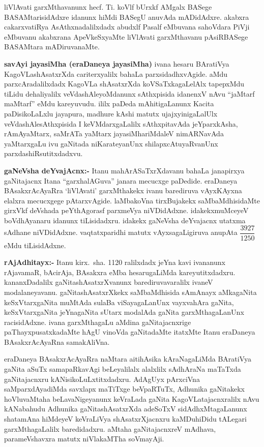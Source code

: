 liVlAvati garxMthavanunx hecf. Ti. koVlf bUrxkf AMgalx BASege BASAMtarisidAdxre idanunx hiMdi BASegU anuvAda mADidAdxre. akabxra cakarxvatiRya AsAthxna\-dalilxdadx abudxlf Pasalf eMbuvana sahoVdara PiVji eMbuvanu akabxrana ApeVkeSxyaMte liVlAvati garxMthavanu pAsiRBASege BASAMtara mADiruvanaMte.

\textbf{savAyi jayasiMha (eraDaneya jayasiMha)}
ivana hesaru BAratiVya KagoVLashAsatxrXda cariterxyalilx bahaLa parxsidadhxvAgide. aMdu parxcAradalilxdadx KagoVLa shAsatxrXda koVSaTxkagaLelAlx tapepxMdu tiLidu dehaliyalilx veVdashAleyoMdanunx sAthxpisida idanenxV nAvu ``jaMtarf maMtarf'' eMdu kareyuvudu. 
ililx paDeda mAhiti\-gaLanunx Kacita paDisikoLaLxlu jayapura, madhure kAshi matutx ujajxyinigaLalUlx veVdashAlesAthxpisida I keVMdarxgaLalilx sAthxpitavAda jeYparxkAsha, rAmAyaMtarx, saMrATa yaMtarx jayasiMhariMdaleV nimARNavAda yaMtarxgaLu ivu gaNitada niKarateyanUnx shilapxcAtuyaRvanUnx parxdashiRsutitxdadxvu.

\textbf{gaNeVsha deYvajAcnx:-} Itanu mahArASaTxrXdavanu bahaLa janapirxya gaNitajacnx Itana ``garxhalAGuva'' janara mecucxge paDedide. eraDaneya BAsakxrAcAyaRra `liVlAvati' garxMthakekx ivanu barediruva vAyxKAyxna elalxra mecucxgege pAtarxvAgide. laMbakoVna tirxBujakekx saMbaMdhisidaMte girxVkf deVshada peYthAgorasf parxmeVya niVDidAdxne. idakekx\break muMceyeV boVdhAyanaru idanunx tiLisidadxru. idakekx gaNeVsha deYvajacnx utatxma sAdhane niVDidAdxne.
vaqtatxparidhi matutx vAyxsagaLigiruva anupAta $\dfrac{3927}{1250}$ eMdu tiLisidAdxne.

\textbf{rAjAdhitayx:-} Itanu kirx.~sha. {\rm 1120} ralilxdadx jeYna kavi ivananunx rAjavamaR, bAcirAja, BAsakxra eMba hesarugaLiMda kareyutitxdadxru. kananxDadalilx gaNitashAsatxrXvanunx barediruvavaralilx ivaneV modalaneyavanu. gaNitashAsatxrXkekx saMbaMdhisida sAmAnayx aMkagaNita keSxVtarxgaNita muMtAda sulaBa viSayagaLanUnx vayxvahAra gaNita, keSxVtarxgaNita jeYnagaNita sUtarx modalAda gaNita garxMthagaLanUnx racisidAdxne. ivana garxMthagaLu aMdina gaNitajacnxrige paThayxpusatxkadaMte hAgU vinoVda gaNitadaMte itatxMte Itanu eraDaneya BAsakxrAcAyaRna samakAliVna.

eraDaneya BAsakxrAcAyaRra naMtara aitihAsika kAraNagaLiMda BAratiVya gaNita aSuTx samapaRkavAgi beLeyalilalx alalxlilx sAdhAraNa maTaTxda gaNitajacnxru kANisikoLuLxtitxdadxru. AdAgUyx pArxciVna saMparxdAyadiMda savxlapx maTiTxge beVpaRTuTx, Adhunika gaNitakekx hoVluvaMtaha beLavaNigeyanunx keVraLada gaNita KagoVLatajacnxralilx nAvu kANabahudu Adhunika gaNitashAsatxrXda adeSoTxV sidAdhxMtagaLanunx shatamAna hiMdeyeV keVraLiVya shAsatxrXjacnxru kaMDuhiDidu tALegari garxMthagaLalilx baredidadxru. aMtaha gaNitajacnxreV mAdhava, parameVshavxra matutx niVlakaMTha soVmayAji.

